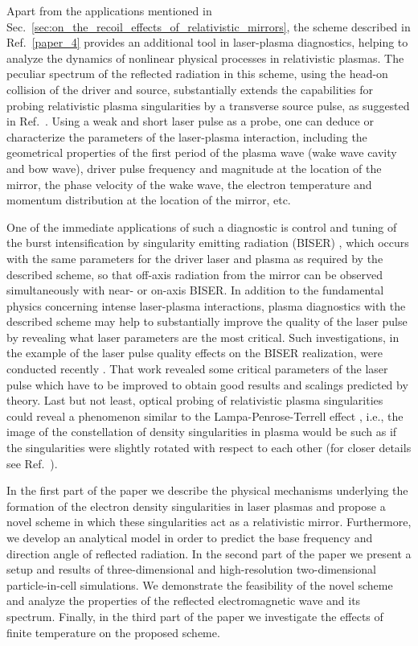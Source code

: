 \documentclass[10pt, a4paper, twoside, openright]{report}
\begin{document}
Apart from the applications mentioned in Sec.~\ref{sec:on_the_recoil_effects_of_relativistic_mirrors}, the scheme described in Ref.~\ref{paper_4} provides an additional tool in laser-plasma diagnostics, helping to analyze the dynamics of nonlinear physical processes in relativistic plasmas. The peculiar spectrum of the reflected radiation in this scheme, using the head-on collision of the driver and source, substantially extends the capabilities for probing relativistic plasma singularities by a transverse source pulse, as suggested in Ref.~. Using a weak and short laser pulse as a probe, one can deduce or characterize the parameters of the laser-plasma interaction, including the geometrical properties of the first period of the plasma wave (wake wave cavity and bow wave), driver pulse frequency and magnitude at the location of the mirror, the phase velocity of the wake wave, the electron temperature and momentum distribution at the location of the mirror, etc. 

One of the immediate applications of such a diagnostic is control and tuning of the burst intensification by singularity emitting radiation (BISER) \cite{Pirozhkov2012, Pirozhkov2014, Pirozhkov2017, Sagisaka2020}, which occurs with the same parameters for the driver laser and plasma as required by the described scheme, so that off-axis radiation from the mirror can be observed simultaneously with near- or on-axis BISER. In addition to the fundamental physics concerning intense laser-plasma interactions, plasma diagnostics with the described scheme may help to substantially improve the quality of the laser pulse by revealing what laser parameters are the most critical. Such investigations, in the example of the laser pulse quality effects on the BISER realization, were conducted recently \cite{Pirozhkov2018}. That work revealed some critical parameters of the laser pulse which have to be improved to obtain good results and scalings predicted by theory. Last but not least, optical probing of relativistic plasma singularities could reveal a phenomenon similar to the Lampa-Penrose-Terrell effect \cite{Lampa1924, Penrose1959, Terrell1959}, i.e., the image of the constellation of density singularities in plasma would be such as if the singularities were slightly rotated with respect to each other (for closer details see Ref.~).

In the first part of the paper we describe the physical mechanisms underlying the formation of the electron density singularities in laser plasmas and propose a novel scheme in which these singularities act as a relativistic mirror. Furthermore, we develop an analytical model in order to predict the base frequency and direction angle of reflected radiation. In the second part of the paper we present a setup and results of three-dimensional and high-resolution two-dimensional particle-in-cell simulations. We demonstrate the feasibility of the novel scheme and analyze the properties of the reflected electromagnetic wave and its spectrum. Finally, in the third part of the paper we investigate the effects of finite temperature on the proposed scheme.
\end{document}
